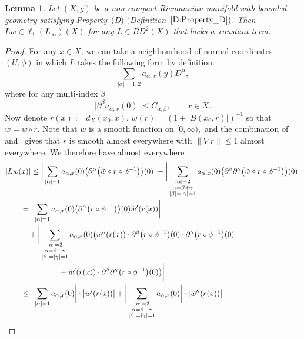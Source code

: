 \documentclass[pdftex]{sigma}
\numberwithin{equation}{section}
\newtheorem{Lemma}[Theorem]{Lemma}
\newcommand{\norm}[1]{\lVert#1\rVert}
\newcommand{\abs}[1]{\lvert#1\rvert}
\begin{document}
\begin{Lemma}\label{L:Dwl1}
Let $(X,g)$ be a non-compact Riemannian manifold with bounded geometry satisfying Property~$($D$)$ $($Definition~$\ref{D:Property_D})$. Then $Lw \in \ell_1(L_\infty)(X)$ for any $L \in BD^2(X)$ that lacks a~constant term.
\end{Lemma}
\begin{proof}
For any $x \in X$, we can take a neighbourhood of normal coordinates $(U, \phi)$ in which $L$ takes the following form by definition:
\[
\sum_{|\alpha|= 1,2} a_{\alpha, x}(y) D^\alpha,
\]
where for any multi-index $\beta$
\[
\big\lvert\partial^\beta a_{\alpha, x}(0)\big\rvert \leq C_{\alpha, \beta}, \qquad x \in X.
\]
Now denote $r(x) := d_X(x_0,x)$, $\tilde{w}(r) = (1+|B(x_0,r)|)^{-1}$ so that $w = \tilde{w} \circ r$. Note that $\tilde{w}$ is a smooth function on $[0,\infty),$ and the combination of~\cite[Lemma~III.4.4]{Sakai1996} and~\cite[Proposition~III.4.8]{Sakai1996} gives that $r$ is smooth almost everywhere with $\norm{\nabla r} \leq 1$ almost everywhere. We therefore have almost everywhere
\begin{align*}
&\abs{Lw(x)}
 \leq \bigg | \sum_{|\alpha|= 1} a_{\alpha, x}(0) \big(\partial^\alpha \big(\tilde{w}\circ r \circ \phi^{-1}\big)\big)(0) \bigg |
 + \bigg | \sum_{\substack{|\alpha|=2\\\alpha = \beta + \gamma\\|\beta|=|\gamma|= 1}} a_{\alpha, x}(0) \big(\partial^\beta \partial^\gamma \big(\tilde{w}\circ r \circ \phi^{-1}\big)\big)(0)\bigg|\\
& \qquad{}= \bigg | \sum_{|\alpha|= 1} a_{\alpha, x}(0) \big(\partial^\alpha \big(r \circ \phi^{-1}\big)\big)(0) \tilde{w}'(r(x)) \bigg |\\
&\qquad\quad{} + \bigg | \sum_{\substack{|\alpha|=2\\\alpha = \beta + \gamma\\|\beta|=|\gamma|= 1}} a_{\alpha, x}(0) \big( \tilde{w}''(r(x)) \cdot \partial^\beta \big(r \circ \phi^{-1}\big)(0) \cdot \partial^\gamma \big(r \circ \phi^{-1}\big)(0) \\
&\qquad \quad{} \hphantom{\bigg | \sum_{\substack{|\alpha|=2\\\alpha = \beta + \gamma\\|\beta|=|\gamma|= 1}}}{}
 + \tilde{w}'(r(x)) \cdot \partial^\beta \partial^\gamma \big(r \circ \phi^{-1}\big)(0)\big) \bigg |\\
&\qquad{}\leq \bigg | \sum_{|\alpha|= 1} a_{\alpha, x}(0) \bigg | \cdot \big|\tilde{w}'(r(x))\big| + \bigg |\sum_{\substack{|\alpha|=2\\\alpha = \beta + \gamma\\|\beta|=|\gamma|= 1}} a_{\alpha,x}(0) \bigg|\cdot \big|\tilde{w}''(r(x))\big| \\

\end{align*}
\end{proof}
\end{document}
